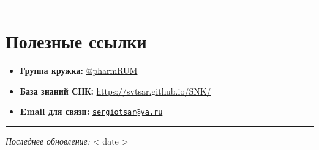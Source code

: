 \documentclass[
  russian,
  letterpaper,
]{book}
\providecommand{\tightlist}{%
  \setlength{\itemsep}{0pt}\setlength{\parskip}{0pt}}
\begin{document}
\begin{center}\rule{0.5\linewidth}{0.5pt}\end{center}

\section{Полезные
ссылки}\label{ux43fux43eux43bux435ux437ux43dux44bux435-ux441ux441ux44bux43bux43aux438}

\begin{itemize}
\tightlist
\item
  \textbf{Группа кружка:} \href{https://t.me/pharmRUM}{@pharmRUM}
\item
  \textbf{База знаний СНК:} \url{https://svtsar.github.io/SNK/}
\item
  \textbf{Email для связи:}
  \href{mailto:sergiotsar@ya.ru}{\nolinkurl{sergiotsar@ya.ru}}
\end{itemize}

\begin{center}\rule{0.5\linewidth}{0.5pt}\end{center}

\emph{Последнее обновление:} {{< date >}}


\backmatter
\end{document}
